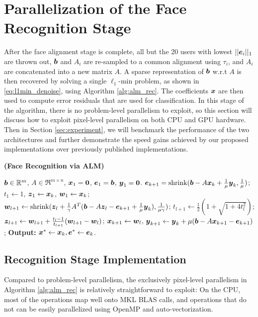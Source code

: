 \documentclass[10pt,twocolumn,letterpaper]{article}
\begin{document}
\section{Parallelization of the Face Recognition Stage}
\label{sec:recognition}
After the face alignment stage is complete, all but the 20 users with lowest
$||\boldsymbol{e}_i||_1$ are thrown out, ${\boldsymbol{b}}$ and $A_i$ are re-sampled to a common alignment
using $\tau_i$, and $A_i$ are concatenated into a new matrix $A$.
A sparse representation of ${\boldsymbol{b}}$ w.r.t $A$ is then recovered
by solving a single $\ell_1$-min problem, as shown
in \eqref{eq:l1min_denoise}, using Algorithm \ref{alg:alm_rec}.  The
coefficients ${\boldsymbol{x}}$ are then used to compute error residuals that are used for
classification.  
In this stage of the algorithm, there is no problem-level
parallelism to exploit, so this section will discuss how to exploit pixel-level parallelism
on both CPU and GPU hardware.
Then in Section \ref{sec:experiment}, we will benchmark the
performance of the two architectures and further demonstrate the speed
gains achieved by our proposed implementations over previously published implementations.

\begin{algorithm}[t]
\caption{\bf (Face Recognition via ALM)} \label{alg:alm_rec} 
\begin{algorithmic}[1]
\begin{small}
 ${\boldsymbol{b}} \in {\mathbb{R}}^m$, $A \in \Re^{m \times n}$,
${\boldsymbol{x}}_1 = \boldsymbol{0}$, $\boldsymbol{e}_1 = {\boldsymbol{b}}$, $\boldsymbol{y}_1 =
\boldsymbol{0}$.
\STATE $\boldsymbol{e}_{k+1} = \textup{shrink}({\boldsymbol{b}} - A{\boldsymbol{x}}_k +
\frac{1}{\mu}\boldsymbol{y}_k, \frac{1}{\mu})$;
\STATE $t_1\leftarrow 1$, $\boldsymbol{z}_1 \leftarrow {\boldsymbol{x}}_k$, $\boldsymbol{w}_1 \leftarrow {\boldsymbol{x}}_k$;
\STATE $\boldsymbol{w}_{l+1} \leftarrow \textup{shrink}(\boldsymbol{z}_l +
\frac{1}{\gamma}A^T({\boldsymbol{b}} - A\boldsymbol{z}_l - \boldsymbol{e}_{k+1} +
\frac{1}{\mu}\boldsymbol{y}_k), \frac{1}{\mu\gamma})$;
\STATE $t_{l+1} \leftarrow \frac{1}{2}( 1 +
\sqrt{1+4t_l^2})$;
\STATE $\boldsymbol{z}_{l+1} \leftarrow \boldsymbol{w}_{l+1} + \frac{t_l - 1}{t_{l+1}}(\boldsymbol{w}_{l+1} - \boldsymbol{w}_l)$;
\ENDWHILE
\STATE ${\boldsymbol{x}}_{k+1} \leftarrow \boldsymbol{w}_{l}$,  \; $\boldsymbol{y}_{k+1} \leftarrow \boldsymbol{y}_k + \mu ({\boldsymbol{b}} - A{\boldsymbol{x}}_{k+1} - \boldsymbol{e}_{k+1})$;
\ENDWHILE \STATE
{\bf Output:} ${\boldsymbol{x}}^* \leftarrow {\boldsymbol{x}}_k, \boldsymbol{e}^* \leftarrow \boldsymbol{e}_k$.
\end{small}
\end{algorithmic}
\end{algorithm}

\subsection{Recognition Stage Implementation} Compared to problem-level
parallelism, the exclusively pixel-level parallelism in Algorithm \ref{alg:alm_rec} is
relatively straightforward to exploit:  
On the CPU, most of the operations map
well onto MKL BLAS calls, and operations that do not can be easily
parallelized using OpenMP and auto-vectorization.
\end{document}
